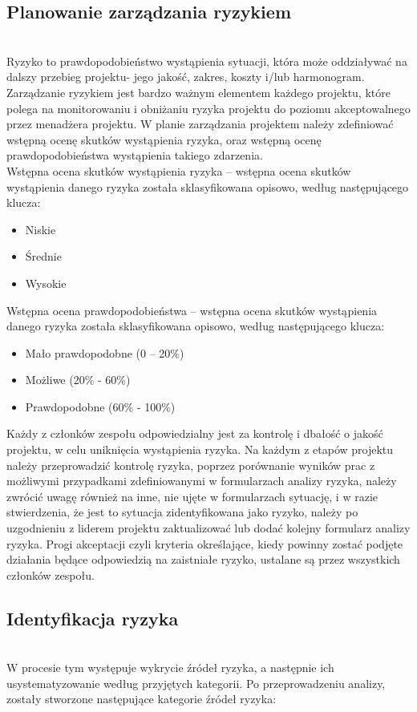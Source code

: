 \documentclass{article}
\begin{document}
\subsection{ Planowanie zarządzania ryzykiem}
\mbox{}\\
Ryzyko to prawdopodobieństwo wystąpienia sytuacji, która może oddziaływać na dalszy przebieg projektu- jego jakość, zakres, koszty i/lub harmonogram.
Zarządzanie ryzykiem jest bardzo ważnym elementem każdego projektu, które polega na monitorowaniu i obniżaniu ryzyka projektu do poziomu akceptowalnego przez menadżera projektu.
W planie zarządzania projektem należy zdefiniować wstępną ocenę skutków wystąpienia ryzyka, oraz wstępną ocenę prawdopodobieństwa wystąpienia takiego zdarzenia.
\mbox{}\\
Wstępna ocena skutków wystąpienia ryzyka – wstępna ocena skutków wystąpienia danego ryzyka została sklasyfikowana opisowo, według następującego klucza:
\begin{itemize}
\item{Niskie}
\item{Średnie}
\item{Wysokie}
\end{itemize}
Wstępna ocena prawdopodobieństwa – wstępna ocena skutków wystąpienia danego ryzyka została sklasyfikowana opisowo, według następującego klucza:
\begin{itemize}
\item{Mało prawdopodobne (0 – 20\%)}
\item{Możliwe (20\% - 60\%)}
\item{Prawdopodobne (60\% - 100\%)}
\end{itemize}
Każdy z członków zespołu odpowiedzialny jest za kontrolę i dbałość o jakość projektu, w celu uniknięcia wystąpienia ryzyka.  
Na każdym z etapów projektu należy przeprowadzić kontrolę ryzyka, poprzez porównanie wyników prac z możliwymi przypadkami zdefiniowanymi w formularzach analizy ryzyka, należy zwrócić uwagę również na inne, nie ujęte w formularzach sytuację, i w razie stwierdzenia, że jest to sytuacja zidentyfikowana jako ryzyko, należy po uzgodnieniu z liderem projektu zaktualizować lub dodać kolejny formularz analizy ryzyka. 
Progi akceptacji czyli kryteria określające, kiedy powinny zostać podjęte działania będące odpowiedzią na zaistniałe ryzyko, ustalane są przez wszystkich członków zespołu.

\subsection{Identyfikacja ryzyka}
\mbox{}\\
W procesie tym występuje wykrycie źródeł ryzyka, a następnie ich usystematyzowanie według przyjętych kategorii. Po przeprowadzeniu analizy, zostały stworzone następujące kategorie źródeł ryzyka:
\end{document}
